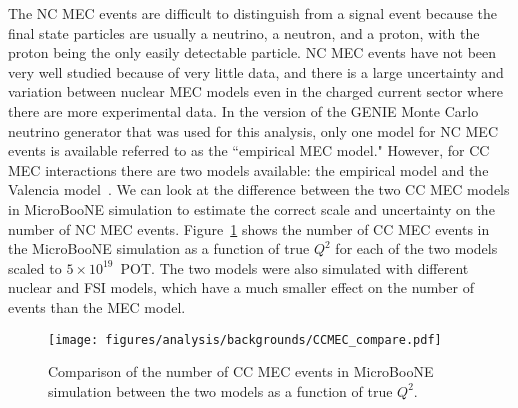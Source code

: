     The NC MEC events are difficult to distinguish from a signal event because
    the final state particles are usually a neutrino, a neutron, and a proton,
    with the proton being the only easily detectable particle. NC MEC events
    have not been very well studied because of very little data, and there is a
    large uncertainty and variation between nuclear MEC models even in the
    charged current sector where there are more experimental data. In the
    version of the GENIE Monte Carlo neutrino generator that was used for this
    analysis, only one model for NC MEC events is available referred to as the
    ``empirical MEC model." However, for CC MEC interactions there are two
    models available: the empirical model and the Valencia
    model~\cite{Nieves:2011pp,Nieves:2011yp}. We can look at the difference
    between the two CC MEC models in MicroBooNE simulation to estimate the
    correct scale and uncertainty on the number of NC MEC events.
    Figure~\ref{fig:ccmec} shows the number of CC MEC events in the MicroBooNE
    simulation as a function of true $Q^2$ for each of the two models scaled to
    $5\times 10^{19}$~POT. The two models were also simulated with different
    nuclear and FSI models, which have a much smaller effect on the number of
    events than the MEC model.
    \begin{figure}[ht]
      \centering
      \texttt{[image: figures/analysis/backgrounds/CCMEC\_compare.pdf]}
      \caption{Comparison of the number of CC MEC events in MicroBooNE
      simulation between the two models as a function of true $Q^2$.}
      \label{fig:ccmec}
    \end{figure}

